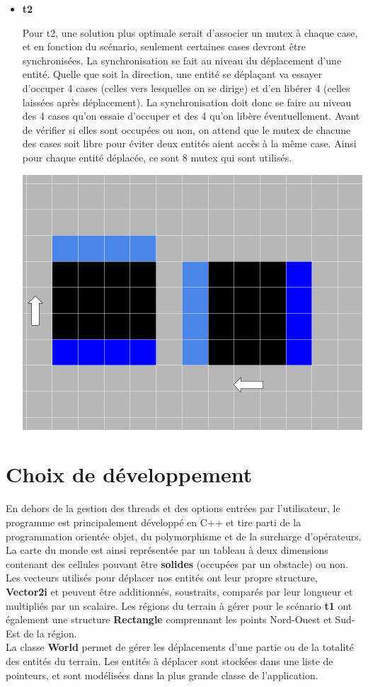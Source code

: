 \documentclass[11pt]{article} %
\begin{document}
\begin{itemize}
	\item \textbf {t2}

Pour t2, une solution plus optimale serait d'associer un mutex à chaque case, et en fonction du scénario, seulement certaines cases devront être synchronisées. 
La synchronisation se fait au niveau du déplacement d'une entité. Quelle que soit la direction, une entité se déplaçant va essayer d'occuper 4 cases (celles vers lesquelles on se dirige) et d'en libérer 4 (celles laissées après déplacement). La synchronisation doit donc se faire au niveau des 4 cases qu'on essaie d'occuper et des 4 qu'on libère éventuellement. Avant de vérifier si elles sont occupées ou non, on attend que le mutex de chacune des cases soit libre pour éviter deux entités aient accès à la même case. Ainsi pour chaque entité déplacée, ce sont 8 mutex qui sont utilisés.

\includegraphics[scale=0.3]{synct2}

\end {itemize}

\section{Choix de développement}
En dehors de la gestion des threads et des options entrées par l'utilisateur, le programme est principalement développé en C++ et tire parti de la programmation orientée objet, du polymorphisme et de la surcharge d'opérateurs. \\
La carte du monde est ainsi représentée par un tableau à deux dimensions contenant des cellules pouvant être \textbf{solides} (occupées par un obstacle) ou non. \\
Les vecteurs utilisés pour déplacer nos entités ont leur propre structure, \textbf{Vector2i} et peuvent être additionnés, soustraits, comparés par leur longueur et multipliés par un scalaire. Les régions du terrain à gérer pour le scénario \textbf{t1} ont également une structure \textbf{Rectangle} comprennant les points Nord-Ouest et Sud-Est de la région. \\
La classe \textbf{World} permet de gérer les déplacements d'une partie ou de la totalité des entités du terrain. Les entités à déplacer sont stockées dans une liste de pointeurs, et sont modélisées dans la plus grande classe de l'application.
\end{document}
